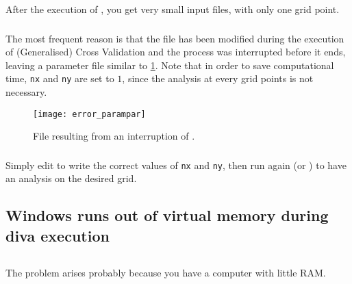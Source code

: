 After the execution of , you get very small input files, with only one grid point.

\subsubsection{\question}

The most frequent reason is that the  file has been modified during the execution of (Generalised) Cross Validation and the process was interrupted before it ends, leaving a parameter file similar to \ref{fig:errorparampar}. Note that in order to save computational time, \texttt{nx} and \texttt{ny} are set to $1$, since the analysis at every grid points is not necessary.

\begin{figure}[htpb]
\centering
\texttt{[image: error\_parampar]}
\caption{File  resulting from an interruption of .\label{fig:errorparampar}}
\end{figure}

\subsubsection{\answer}


Simply edit  to write the correct values of \texttt{nx} and \texttt{ny}, then run again  (or ) to have an analysis on the desired grid.






\subsection{Windows runs out of virtual memory during diva execution}


\subsection{\question}

The problem arises probably because you have a computer with little RAM.

